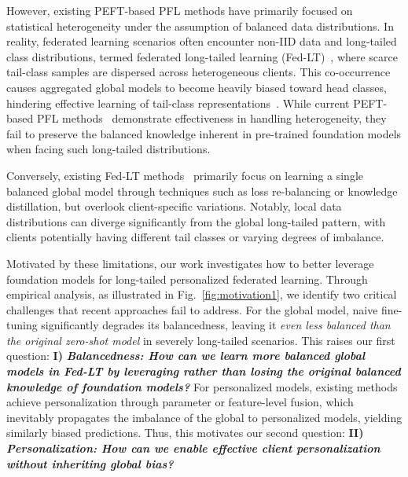 \documentclass[10pt,twocolumn,letterpaper]{article}
\begin{document}
However, existing PEFT-based PFL methods have primarily focused on statistical heterogeneity under the assumption of balanced data distributions. In reality, federated learning scenarios often encounter non-IID data and long-tailed class distributions, termed federated long-tailed learning (Fed-LT)~\cite{li2024federated, xiao2024fedloge, zhang2024rucr}, where scarce tail-class samples are dispersed across heterogeneous clients. This co-occurrence causes aggregated global models to become heavily biased toward head classes, hindering effective learning of tail-class representations~\cite{shang2022federated, hou2025capt}. While current PEFT-based PFL methods~\cite{guo2023pfedprompt, li2024fedotp} demonstrate effectiveness in handling heterogeneity, they fail to preserve the balanced knowledge inherent in pre-trained foundation models when facing such long-tailed distributions. 

Conversely, existing Fed-LT methods~\cite{sarkar2020fed, wang2021ratioloss, hou2025capt, shi2024clip2fl} primarily focus on learning a single balanced global model through techniques such as loss re-balancing or knowledge distillation, but overlook client-specific variations. Notably, local data distributions can diverge significantly from the global long-tailed pattern, with clients potentially having different tail classes or varying degrees of imbalance.



Motivated by these limitations, our work investigates how to better leverage foundation models for long-tailed personalized federated learning. Through empirical analysis, as illustrated in Fig.~\ref{fig:motivation1}, we identify two critical challenges that recent approaches fail to address. For the global model, naive fine-tuning significantly degrades its balancedness, leaving it \textit{even less balanced than the original zero-shot model} in severely long-tailed scenarios. This raises our first question: \hypertarget{q1}{\textbf{I)} \textbf{\textit{Balancedness: How can we learn more balanced global models in Fed-LT by leveraging rather than losing the original balanced knowledge of foundation models?}}} For personalized models, existing methods achieve personalization through parameter or feature-level fusion, which inevitably propagates the imbalance of the global to personalized models, yielding similarly biased predictions. Thus, this motivates our second question: \hypertarget{q2}{\textbf{II)}} \textbf{\textit{Personalization: How can we enable effective client personalization without inheriting global bias?}}
\end{document}
